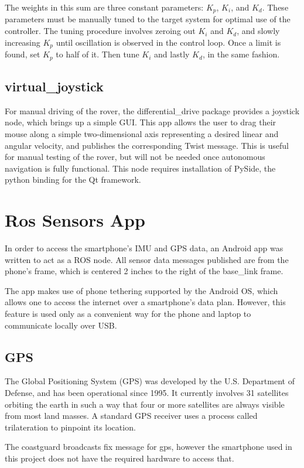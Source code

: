 The weights in this sum are three constant parameters: \(K_p\), \(K_i\), and \(K_d\). These parameters must be manually tuned to the target system for optimal use of the controller. The tuning procedure involves zeroing out \(K_i\) and \(K_d\), and slowly increasing \(K_p\) until oscillation is observed in the control loop. Once a limit is found, set \(K_p\) to half of it. Then tune \(K_i\) and lastly \(K_d\), in the same fashion. 

\subsection{virtual\_joystick} \label{sectionJoystick}
For manual driving of the rover, the differential\_drive package provides a joystick node, which brings up a simple GUI. This app allows the user to drag their mouse along a simple two-dimensional axis representing a desired linear and angular velocity, and publishes the corresponding Twist message. This is useful for manual testing of the rover, but will not be needed once autonomous navigation is fully functional. This node requires installation of PySide, the python binding for the Qt framework.

\section{Ros Sensors App}
In order to access the smartphone's IMU and GPS data, an Android app was written to act as a ROS node. All sensor data messages published are from the phone's frame, which is centered 2 inches to the right of the base\_link frame.

The app makes use of phone tethering supported by the Android OS, which allows one to access the internet over a smartphone's data plan. However, this feature is used only as a convenient way for the phone and laptop to communicate locally over USB.

\subsection{GPS}
The Global Positioning System (GPS) was developed by the U.S. Department of Defense, and has been operational since 1995. It currently involves 31 satellites orbiting the earth in such a way that four or more satellites are always visible from most land masses. A standard GPS receiver uses a process called trilateration to pinpoint its location. \cite{}

The coastguard broadcasts fix message for gps, however the smartphone used in this project does not have the required hardware to access that.

